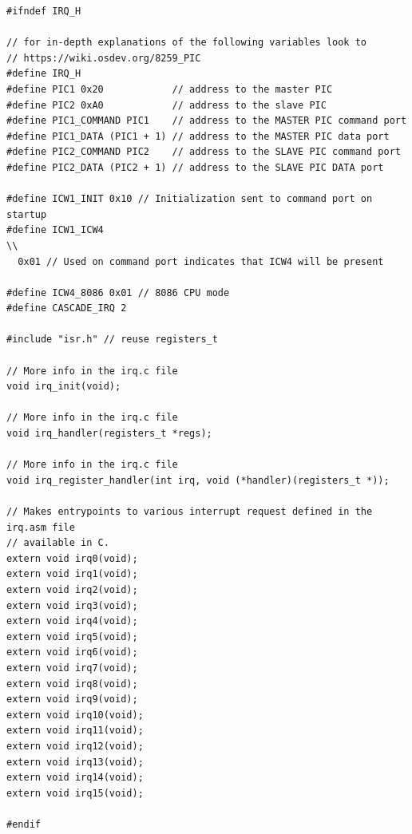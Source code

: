\documentclass[../main.tex]{subfiles}
\begin{document}
\begin{listing}[H]
    \begin{verbatim}
#ifndef IRQ_H

// for in-depth explanations of the following variables look to
// https://wiki.osdev.org/8259_PIC
#define IRQ_H
#define PIC1 0x20            // address to the master PIC
#define PIC2 0xA0            // address to the slave PIC
#define PIC1_COMMAND PIC1    // address to the MASTER PIC command port
#define PIC1_DATA (PIC1 + 1) // address to the MASTER PIC data port
#define PIC2_COMMAND PIC2    // address to the SLAVE PIC command port
#define PIC2_DATA (PIC2 + 1) // address to the SLAVE PIC DATA port

#define ICW1_INIT 0x10 // Initialization sent to command port on startup
#define ICW1_ICW4                                                              \\
  0x01 // Used on command port indicates that ICW4 will be present

#define ICW4_8086 0x01 // 8086 CPU mode
#define CASCADE_IRQ 2

#include "isr.h" // reuse registers_t

// More info in the irq.c file
void irq_init(void);

// More info in the irq.c file
void irq_handler(registers_t *regs);

// More info in the irq.c file
void irq_register_handler(int irq, void (*handler)(registers_t *));

// Makes entrypoints to various interrupt request defined in the irq.asm file
// available in C.
extern void irq0(void);
extern void irq1(void);
extern void irq2(void);
extern void irq3(void);
extern void irq4(void);
extern void irq5(void);
extern void irq6(void);
extern void irq7(void);
extern void irq8(void);
extern void irq9(void);
extern void irq10(void);
extern void irq11(void);
extern void irq12(void);
extern void irq13(void);
extern void irq14(void);
extern void irq15(void);

#endif
    \end{verbatim}
    \caption{Implementation of \texttt{irq.h}}
    \label{lst:irq_h}
\end{listing}
\end{document}

